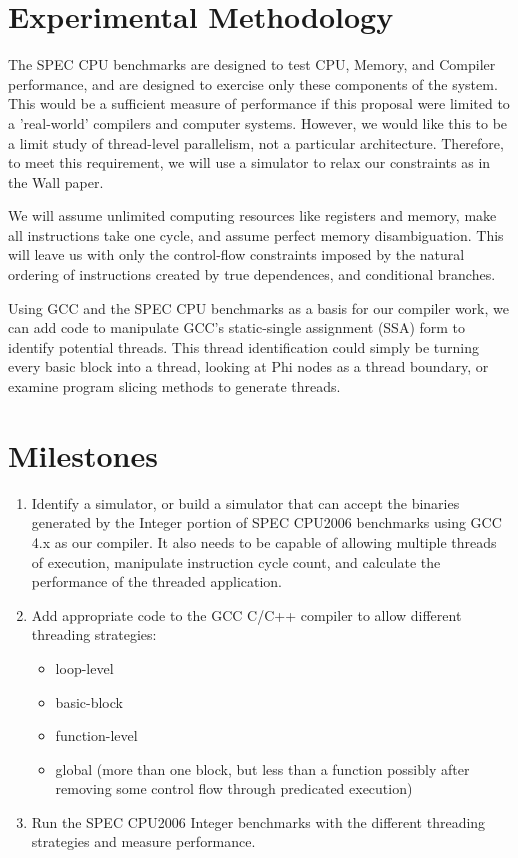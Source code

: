 \documentclass[12pt,twoside,letterpaper]{article}
\begin{document}
\section*{Experimental Methodology}
The SPEC CPU benchmarks are designed to test CPU, Memory, and Compiler performance, and are designed to exercise only these components of the system. This would be a sufficient measure of performance if this proposal were limited to a 'real-world' compilers and computer systems. However, we would like this to be a limit study of thread-level parallelism, not a particular architecture. Therefore, to meet this requirement, we will use a simulator to relax our constraints as in the Wall paper.

We will assume unlimited computing resources like registers and memory, make all instructions take one cycle, and assume perfect memory disambiguation. This will leave us with only the control-flow constraints imposed by the natural ordering of instructions created by true dependences, and conditional branches.

Using GCC and the SPEC CPU benchmarks as a basis for our compiler work, we can add code to manipulate GCC's static-single assignment (SSA) form to identify potential threads. This thread identification could simply be turning every basic block into a thread, looking at Phi nodes as a thread boundary, or examine program slicing methods to generate threads.

\section*{Milestones}
\begin{enumerate}
\item Identify a simulator, or build a simulator that can accept the binaries generated by the Integer portion of SPEC CPU2006 benchmarks using GCC 4.x as our compiler. It also needs to be capable of allowing multiple threads of execution, manipulate instruction cycle count, and calculate the performance of the threaded application.
\item Add appropriate code to the GCC C/C++ compiler to allow different threading strategies:
    \begin{itemize}
		\item loop-level
		\item basic-block
		\item function-level
		\item global (more than one block, but less than a function possibly after removing some control flow through predicated execution)
    \end{itemize}
\item Run the SPEC CPU2006 Integer benchmarks with the different threading strategies and measure performance.
\end{enumerate}


\end{document}
